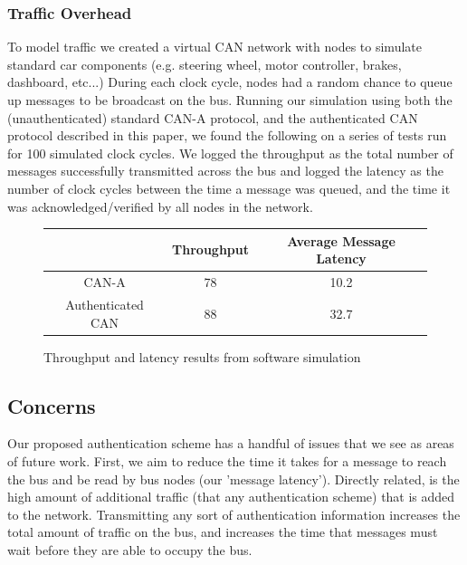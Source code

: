 \documentclass{article}
\begin{document}
    \subsubsection{Traffic Overhead}
    To model traffic we created a virtual CAN network with nodes to simulate standard car components (e.g. steering wheel, motor controller, brakes, dashboard, etc...) During each clock cycle, nodes had a random chance to queue up messages to be broadcast on the bus. Running our simulation using both the (unauthenticated) standard CAN-A protocol, and the authenticated CAN protocol described in this paper, we found the following on a series of tests run for 100 simulated clock cycles. We logged the throughput as the total number of messages successfully transmitted across the bus and logged the latency as the number of clock cycles between the time a message was queued, and the time it was acknowledged/verified by all nodes in the network. 
    
    \begin{figure}
    \centering
    \begin{tabular}{|c|c|c|}
    \hline
    & Throughput & Average Message Latency \\ \hline
    CAN-A & 78 & 10.2\\ \hline
    Authenticated CAN & 88 & 32.7 \\ \hline
    \end{tabular}
    \caption{Throughput and latency results from software simulation}
    \end{figure}
    
    \subsection{Concerns}
    Our proposed authentication scheme has a handful of issues that we see as areas of future work. First, we aim to reduce the time it takes for a message to reach the bus and be read by bus nodes (our 'message latency'). Directly related, is the high amount of additional traffic (that any authentication scheme) that is added to the network. Transmitting any sort of authentication information increases the total amount of traffic on the bus, and increases the time that messages must wait before they are able to occupy the bus.\\
    
\end{document}
